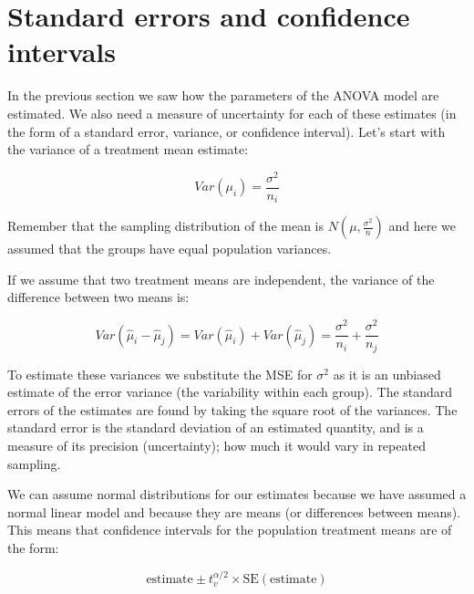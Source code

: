 \documentclass[
  letterpaper,
]{book}
\begin{document}
\section{Standard errors and confidence
intervals}\label{standard-errors-and-confidence-intervals}

In the previous section we saw how the parameters of the ANOVA model are
estimated. We also need a measure of uncertainty for each of these
estimates (in the form of a standard error, variance, or confidence
interval). Let's start with the variance of a treatment mean estimate:


\[Var(\mu_i) = \frac{\sigma^2}{n_i} \]

Remember that the sampling distribution of the mean is
\(N(\mu,\frac{\sigma^2}{n})\) and here we assumed that the groups have
equal population variances.

If we assume that two treatment means are independent, the variance of
the difference between two means is:

\[
Var(\hat{\mu}_i - \hat{\mu}_j) = Var(\hat{\mu}_i) + Var(\hat{\mu}_j) = \frac{\sigma^2}{n_i} + \frac{\sigma^2}{n_j}
\]

To estimate these variances we substitute the MSE for \(\sigma^2\) as it
is an unbiased estimate of the error variance (the variability within
each group). The standard errors of the estimates are found by taking
the square root of the variances. The standard error is the standard
deviation of an estimated quantity, and is a measure of its precision
(uncertainty); how much it would vary in repeated sampling.

We can assume normal distributions for our estimates because we have
assumed a normal linear model and because they are means (or differences
between means). This means that confidence intervals for the population
treatment means are of the form:

\[ \text{estimate} \pm t^{\alpha/2}_v \times \text{SE}(\text{estimate})\]
\end{document}

